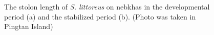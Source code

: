 \documentclass[]{interact}
\theoremstyle{plain}%
\theoremstyle{definition}
\theoremstyle{remark}
\begin{document}
\begin{figure}[!h]
  \centering
  \hspace{5pt}
  \caption{The stolon length of \textit{S. littoreus} on nebkhas in the developmental period (a) and the stabilized period (b). (Photo was taken in Pingtan Island)} 
  \label{fig:added}
\end{figure}
\end{document}
